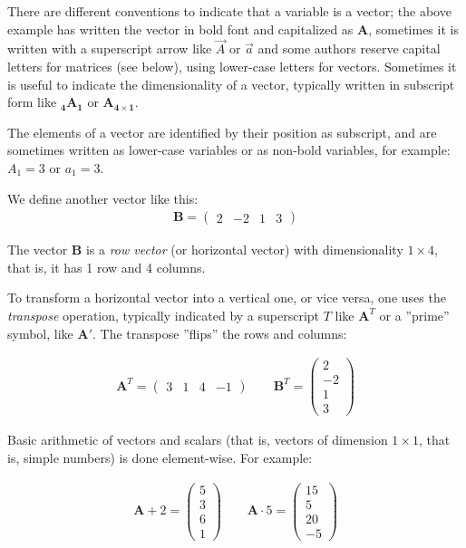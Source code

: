 There are different conventions to indicate that a variable is a vector; the above example has written the vector in bold font and capitalized as $\mathbf{A}$, sometimes it is written with a superscript arrow like $\overrightarrow{A}$ or $\overrightarrow{a}$ and some authors reserve capital letters for matrices (see below), using lower-case letters for vectors. Sometimes it is useful to indicate the dimensionality of a vector, typically written in subscript form like $\mathbf{_4 A _1}$ or $\mathbf{A_{4 \times 1}}$. 

The elements of a vector are identified by their position as subscript, and are sometimes written as lower-case variables or as non-bold variables, for example: $A_1 = 3$ or $a_1 = 3$.

We define another vector like this:
\begin{align*}
\mathbf{B} = \begin{pmatrix}2 & -2 & 1 & 3\end{pmatrix}
\end{align*}

The vector $\mathbf{B}$ is a \emph{row vector} (or horizontal vector) with dimensionality $1 \times 4$, that is, it has 1 row and 4 columns.

To transform a horizontal vector into a vertical one, or vice versa, one uses the \emph{transpose} operation, typically indicated by a superscript $T$ like $\mathbf{A}^T$ or a ''prime'' symbol, like $\mathbf{A}'$. The transpose ''flips'' the rows and columns:

\begin{align*}
\mathbf{A}^T = \begin{pmatrix}3 & 1 & 4 & -1\end{pmatrix} \qquad
\mathbf{B}^T = \begin{pmatrix}2 \\ -2 \\ 1 \\ 3 \end{pmatrix}
\end{align*}

Basic arithmetic of vectors and scalars (that is, vectors of dimension $1 \times 1$, that is, simple numbers) is done element-wise. For example:

\begin{align*}
\mathbf{A} + 2 = \begin{pmatrix}5 \\ 3 \\ 6 \\ 1 \end{pmatrix} \qquad
\mathbf{A} \cdot 5 = \begin{pmatrix}15 \\ 5 \\ 20 \\ -5\end{pmatrix}
\end{align*}

